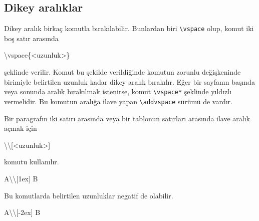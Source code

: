 \documentclass[
  10pt,
]{scrbook}
\newenvironment{Shaded}{\begin{snugshade}}{\end{snugshade}}
\newcommand{\NormalTok}[1]{#1}
\newcommand{\SpecialCharTok}[1]{\textcolor[rgb]{0.00,0.00,0.00}{#1}}
\begin{document}
\hypertarget{dikey-aralux131klar}{%
\subsection{Dikey aralıklar}\label{dikey-aralux131klar}}

Dikey aralık birkaç komutla bırakılabilir. Bunlardan biri \texttt{\textbackslash{}vspace}
olup, komut iki boş satır arasında

\begin{Shaded}
\begin{Highlighting}[]
\NormalTok{\textbackslash{}vspace\{}\SpecialCharTok{\textless{}}\NormalTok{uzunluk}\SpecialCharTok{\textgreater{}}\NormalTok{\}}
\end{Highlighting}
\end{Shaded}

şeklinde verilir. Komut bu şekilde verildiğinde komutun zorunlu
değişkeninde birimiyle belirtilen uzunluk kadar dikey aralık bırakılır.
Eğer bir sayfanın başında veya sonunda aralık bırakılmak istenirse,
komut \texttt{\textbackslash{}vspace*} şeklinde yıldızlı vermelidir. Bu komutun aralığa ilave
yapan \texttt{\textbackslash{}addvspace} sürümü de vardır.

Bir paragrafın iki satırı arasında veya bir tablonun satırları arasında
ilave aralık açmak için

\begin{Shaded}
\begin{Highlighting}[]
\NormalTok{\textbackslash{}\textbackslash{}[}\SpecialCharTok{\textless{}}\NormalTok{uzunluk}\SpecialCharTok{\textgreater{}}\NormalTok{]}
\end{Highlighting}
\end{Shaded}

komutu kullanılır.

\begin{Shaded}
\begin{Highlighting}[]
\NormalTok{A\textbackslash{}\textbackslash{}[1ex]}
\NormalTok{B}
\end{Highlighting}
\end{Shaded}

Bu komutlarda belirtilen uzunluklar negatif de olabilir.

\begin{Shaded}
\begin{Highlighting}[]
\NormalTok{A\textbackslash{}\textbackslash{}[}\SpecialCharTok{{-}}\NormalTok{2ex]}
\NormalTok{B}
\end{Highlighting}
\end{Shaded}
\end{document}
